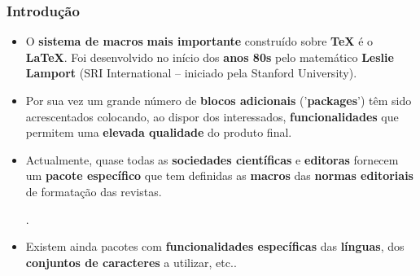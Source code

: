\documentclass[12pt]{beamer}
\begin{document}
\begin{frame}
\frametitle{{\color{blue}\bf Introdução}}
\begin{itemize}
\item<1->O {\color{DarkGreen}\bf sistema de macros} {\color{red}\bf mais importante} 
construído sobre {\color{blue}\bf \TeX} é o {\color{blue}\bf \LaTeX}.
Foi desenvolvido no início dos {\color{blue}\bf anos 80s} pelo 
matemático {\color{blue}\bf Leslie Lamport} 
(SRI International -- iniciado pela Stanford University).
\item<2->Por sua vez um grande número de {\color{DarkGreen}\bf blocos adicionais} 
('{\color{DarkGreen}\bf packages}')
têm sido acrescentados colocando, ao dispor dos interessados, 
{\color{DarkRed}\bf funcionalidades} que permitem 
uma {\color{red}\bf elevada qualidade} do produto final.
\item<3->Actualmente, quase todas as {\color{DarkGreen}\bf sociedades científicas} 
e {\color{DarkGreen}\bf editoras} fornecem um {\color{DarkRed}\bf pacote específico} 
que tem definidas as {\color{blue}\bf macros} das 
{\color{blue}\bf normas editoriais} de formatação das revistas. %
\par{}.
\item<5->Existem ainda pacotes com {\color{DarkGreen}\bf funcionalidades específicas} 
das {\color{DarkRed}\bf línguas}, dos {\color{DarkRed}\bf conjuntos de caracteres} 
a utilizar, etc..
\end{itemize}
\end{frame}
\end{document}
